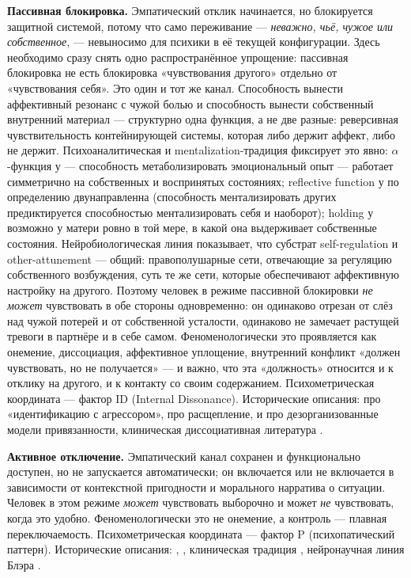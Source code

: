 \textbf{Пассивная блокировка.} Эмпатический отклик начинается, но блокируется защитной системой, потому что само переживание --- \emph{неважно, чьё, чужое или собственное}, --- невыносимо для психики в её текущей конфигурации. Здесь необходимо сразу снять одно распространённое упрощение: пассивная блокировка не есть блокировка «чувствования другого» отдельно от «чувствования себя». Это один и тот же канал. Способность вынести аффективный резонанс с чужой болью и способность вынести собственный внутренний материал --- структурно одна функция, а не две разные: реверсивная чувствительность контейнирующей системы, которая либо держит аффект, либо не держит. Психоаналитическая и mentalization-традиция фиксирует это явно: $\alpha$-функция у \citet{bion1962} --- способность метаболизировать эмоциональный опыт --- работает симметрично на собственных и воспринятых состояниях; reflective function у \citet{fonagy2002} по определению двунаправленна (способность ментализировать других предиктируется способностью ментализировать себя и наоборот); holding у \citet{winnicott1965} возможно у матери ровно в той мере, в какой она выдерживает собственные состояния. Нейробиологическая линия \citet{schore2001} показывает, что субстрат self-regulation и other-attunement --- общий: правополушарные сети, отвечающие за регуляцию собственного возбуждения, суть те же сети, которые обеспечивают аффективную настройку на другого. Поэтому человек в режиме пассивной блокировки \emph{не может} чувствовать в обе стороны одновременно: он одинаково отрезан от слёз над чужой потерей и от собственной усталости, одинаково не замечает растущей тревоги в партнёре и в себе самом. Феноменологически это проявляется как онемение, диссоциация, аффективное уплощение, внутренний конфликт «должен чувствовать, но не получается» --- и важно, что эта «должность» относится и к отклику на другого, и к контакту со своим содержанием. Психометрическая координата --- фактор ID (Internal Dissonance). Исторические описания: \citet{ferenczi1933} про «идентификацию с агрессором», \citet{klein1946} про расщепление, \citet{bowlby1969} и \citet{main1986} про дезорганизованные модели привязанности, клиническая диссоциативная литература \citep{putnam1997, vanderkolk2014}.

\textbf{Активное отключение.} Эмпатический канал сохранен и функционально доступен, но не запускается автоматически; он включается или не включается в зависимости от контекстной пригодности и морального нарратива о ситуации. Человек в этом режиме \emph{может} чувствовать выборочно и может \emph{не} чувствовать, когда это удобно. Феноменологически это не онемение, а контроль --- плавная переключаемость. Психометрическая координата --- фактор P (психопатический паттерн). Исторические описания: \citet{cleckley1941}, \citet{karpman1941}, клиническая традиция \citep{hare1991, lilienfeld1990}, нейронаучная линия Блэра \citep{blair1995, blair2013}.

